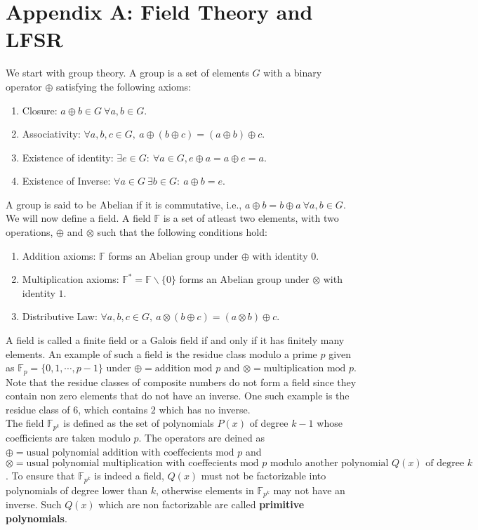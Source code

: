 \section*{Appendix A: Field Theory and LFSR}
\label{appA}
\noindent We start with group theory. A group is a set of elements $G$ with a binary operator $\oplus$ satisfying the following axioms:
\begin{enumerate}
\item Closure: $a\oplus b\in G\ \forall a,b\in G$.
\item Associativity: $\forall a,b,c\in G,\ a\oplus(b\oplus c)=(a\oplus b)\oplus c$.
\item Existence of identity: $\exists e\in G:\ \forall a\in G, e\oplus a=a\oplus e=a$.
\item Existence of Inverse: $\forall a\in G\ \exists b\in G:\ a\oplus b=e$.
\end{enumerate}
A group is said to be Abelian if it is commutative, i.e., $a\oplus b=b\oplus a\ \forall a,b\in G$.\\
We will now define a field. A field $\mathbb{F}$ is a set of atleast two elements, with two operations, $\oplus$ and $\otimes$ such that the following conditions hold:
\begin{enumerate}
\item Addition axioms: $\mathbb{F}$ forms an Abelian group under $\oplus$ with identity $0$.
\item Multiplication axioms: $\mathbb{F}^*=\mathbb{F}\backslash\{0\}$ forms an Abelian group under $\otimes$ with identity $1$.
\item Distributive Law: $\forall a,b,c\in G,\ a\otimes(b\oplus c)=(a\otimes b)\oplus c$.
\end{enumerate}
A field is called a finite field or a Galois field if and only if it has finitely many elements. An example of such a field is the residue class modulo a prime $p$ given as $\mathbb{F}_p=\{0,1,\cdots,p-1\}$ under $\oplus = \text{addition mod }p$ and $\otimes = \text{multiplication mod }p$. Note that the residue classes of composite numbers do not form a field since they contain non zero elements that do not have an inverse. One such example is the residue class of $6$, which contains $2$ which has no inverse.\\
The field $\mathbb{F}_{p^k}$ is defined as the set of polynomials $P(x)$ of degree $k-1$ whose coefficients are taken modulo $p$. The operators are deined as $\oplus = \text{usual polynomial addition with coeffecients mod }p$ and $\otimes = \text{usual polynomial multiplication with coeffecients mod }p\text{ modulo another polynomial }Q(x)\text{ of degree }k$. To ensure that $\mathbb{F}_{p^k}$ is indeed a field, $Q(x)$ must not be factorizable into polynomials of degree lower than $k$, otherwise elements in $\mathbb{F}_{p^k}$ may not have an inverse. Such $Q(x)$ which are non factorizable are called \textbf{primitive polynomials}.

